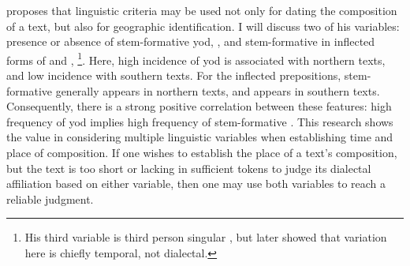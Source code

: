 \Textcite{Tho_Middle93} proposes that linguistic criteria may be used not only for dating the composition of a text, but also for geographic identification. I will discuss two of his variables: presence or absence of stem-formative yod, \eg {}, and stem-formative  in inflected forms of  and , \eg {}\footnote{His third variable is third person singular , but \textcite{Rod_Datable98} later showed that variation here is chiefly temporal, not dialectal.}. Here, high incidence of yod is associated with northern texts, and low incidence with southern texts. For the inflected prepositions, stem-formative  generally appears in northern texts, and  appears in southern texts. Consequently, there is a strong positive correlation between these features: high frequency of yod implies high frequency of stem-formative . This research shows the value in considering multiple linguistic variables when establishing time and place of composition. If one wishes to establish the place of a text's composition, but the text is too short or lacking in sufficient tokens to judge its dialectal affiliation based on either variable, then one may use both variables to reach a reliable judgment.

